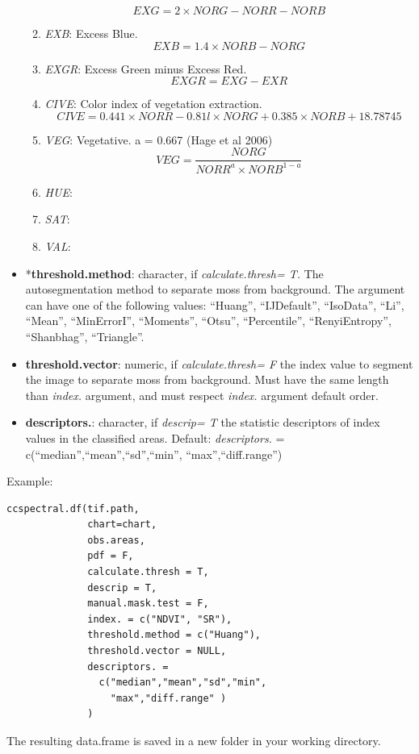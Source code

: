 \documentclass[
]{article}
\begin{document}
\begin{itemize}
\begin{enumerate}
\[        EXG = 2 \times NORG - NORR - NORB       
        \]
        \item \emph{EXB}:  Excess Blue.
         \[
         EXB = 1.4 \times NORB - NORG
         \]
        \item \emph{EXGR}: Excess Green minus Excess Red.
        \[
        EXGR = EXG - EXR
        \]
        \item \emph{CIVE}: Color index of vegetation extraction.        
        \[
        CIVE = 0.441 \times NORR - 0.81 l \times NORG + 0.385 \times NORB + 18.78745
        \]
        \item \emph{VEG}: Vegetative. a = 0.667 (Hage et al 2006)
        \[
        VEG = \frac{NORG}{NORR^a \times NORB^{1-a}}
        \]
        \item \emph{HUE}: 
        
        \item \emph{SAT}: 
      
        \item \emph{VAL}: 
     
        
    \end{enumerate}
  
\item
  *\textbf{threshold.method}: character, if \emph{calculate.thresh= T.}
  The autosegmentation method to separate moss from background. The
  argument can have one of the following values: ``Huang'',
  ``IJDefault'', ``IsoData'', ``Li'', ``Mean'', ``MinErrorI'',
  ``Moments'', ``Otsu'', ``Percentile'', ``RenyiEntropy'', ``Shanbhag'',
  ``Triangle''.
\item
  \textbf{threshold.vector}: numeric, if \emph{calculate.thresh= F} the
  index value to segment the image to separate moss from background.
  Must have the same length than \emph{index.} argument, and must
  respect \emph{index.} argument default order.
\item
  \textbf{descriptors.}: character, if \emph{descrip= T} the statistic
  descriptors of index values in the classified areas. Default:
  \emph{descriptors.} = c(``median'',``mean'',``sd'',``min'',
  ``max'',``diff.range'')
\end{itemize}


Example:

\begin{verbatim}
ccspectral.df(tif.path,
              chart=chart,
              obs.areas,
              pdf = F,
              calculate.thresh = T,
              descrip = T,
              manual.mask.test = F,
              index. = c("NDVI", "SR"),
              threshold.method = c("Huang"),
              threshold.vector = NULL,
              descriptors. = 
                c("median","mean","sd","min",
                  "max","diff.range" )
              )
\end{verbatim}

The resulting data.frame is saved in a new folder in your working
directory.
\end{document}
